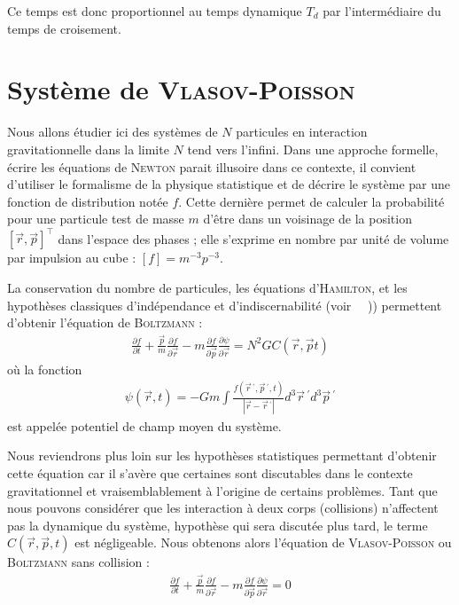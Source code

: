 		Ce temps est donc proportionnel au temps dynamique $T_d$ par l'intermédiaire du temps de croisement.

\section{Syst\`{e}me de \textsc{Vlasov}-\textsc{Poisson}}

	Nous allons \'{e}tudier ici des syst\`{e}mes de $N$ particules en interaction gravitationnelle dans la limite $N$ tend vers l'infini.
	Dans une approche formelle, \'{e}crire les \'{e}quations de \textsc{Newton} parait illusoire dans ce contexte, il convient d'utiliser le formalisme de la physique statistique et de d\'{e}crire le syst\`{e}me par une fonction de distribution not\'{e}e $f$.
	Cette derni\`{e}re permet de calculer la probabilit\'{e} pour une particule test de masse $m$ d'\^{e}tre dans un voisinage de la
	position $\left[\vec{r},\vec{p}\right]^\top$ dans l'espace des phases ; elle
	s'exprime en nombre par unit\'{e} de volume par impulsion au cube : $\left[ f\right] = m^{-3}p^{-3}$.

	La conservation du nombre de particules, les \'{e}quations d'\textsc{Hamilton}, et les hypoth\`{e}ses classiques d'ind\'{e}pendance et d'indiscernabilit\'{e} (voir ~\cite{CoursJP}~)) permettent d'obtenir l'\'{e}quation de \textsc{Boltzmann} :
	\begin{align}
		\frac{\partial f}{\partial t} +\frac{\vec{p}}{m}\frac{\partial f}{\partial \vec{r}} - m\frac{\partial f}{\partial \vec{p}} \frac{\partial \psi}{\partial \vec{r}} = N^2 G C(\vec{r},\vec{p} t)
		\label{Fok-Plan}
	\end{align}
	o\`{u} la fonction
	\begin{align}
		\psi(\vec{r},t)=-Gm\int\frac{f(\vec{r}\,^{\prime},\vec{p}\,^{\prime}, t)}
		{\left|\vec{r}-\vec{r}\,^{\prime}\right|}
		d^3\vec{r}\,^{\prime}d^3\vec{p}\,^{\prime}
		\label{pot-grav}
	\end{align}
	est appel\'{e}e potentiel de champ moyen du syst\`{e}me.
	
	Nous reviendrons plus loin sur les hypoth\`{e}ses statistiques permettant d'obtenir cette \'{e}quation car il s'av\`{e}re que certaines sont discutables dans le contexte gravitationnel et vraisemblablement \`{a} l'origine de certains probl\`{e}mes. Tant que nous pouvons consid\'{e}rer que les  interaction \`{a} deux corps (collisions) n'affectent pas la dynamique du syst\`{e}me, hypoth\`{e}se qui sera discut\'{e}e plus tard, le
	terme  $ C(\vec{r},\vec{p}, t) $ est n\'{e}gligeable. Nous obtenons alors l'\'{e}quation de
	\textsc{Vlasov-Poisson} ou \textsc{Boltzmann} sans collision :
	\begin{align}
		\frac{\partial f}{\partial t} +\frac{\vec{p}}{m}\frac{\partial f}{\partial \vec{r}} - m\frac{\partial f}{\partial \vec{p}} \frac{\partial \psi}{\partial \vec{r}} = 0
		\label{Vla-Pois}
	\end{align}

